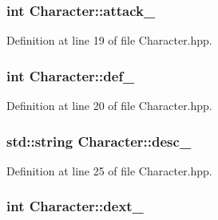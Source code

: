 \hypertarget{class_character_af7c66c07511bfb6a844510c09262f9f7}{
\subsubsection[{attack\-\_\-}]{\setlength{\rightskip}{0pt plus 5cm}int Character\-::attack\-\_\-\hspace{0.3cm}{\ttfamily [protected]}}}\label{class_character_af7c66c07511bfb6a844510c09262f9f7}


Definition at line 19 of file Character.\-hpp.

\hypertarget{class_character_af5403de4a39c8859b69335e60ea3d6ca}{
\subsubsection[{def\-\_\-}]{\setlength{\rightskip}{0pt plus 5cm}int Character\-::def\-\_\-\hspace{0.3cm}{\ttfamily [protected]}}}\label{class_character_af5403de4a39c8859b69335e60ea3d6ca}


Definition at line 20 of file Character.\-hpp.

\hypertarget{class_character_af3efafb3ef9078df69d9cefb701b9b25}{
\subsubsection[{desc\-\_\-}]{\setlength{\rightskip}{0pt plus 5cm}std\-::string Character\-::desc\-\_\-\hspace{0.3cm}{\ttfamily [protected]}}}\label{class_character_af3efafb3ef9078df69d9cefb701b9b25}


Definition at line 25 of file Character.\-hpp.

\hypertarget{class_character_a3cc8f2752c0199a62e8fef854bfca6d5}{
\subsubsection[{dext\-\_\-}]{\setlength{\rightskip}{0pt plus 5cm}int Character\-::dext\-\_\-\hspace{0.3cm}{\ttfamily [protected]}}}\label{class_character_a3cc8f2752c0199a62e8fef854bfca6d5}


